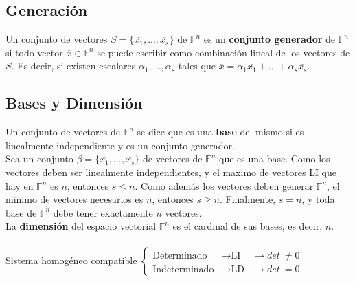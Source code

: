 \documentclass[11pt,a4paper]{article}
\begin{document}
\subsection{Generaci\'on}
Un conjunto de vectores $S = \{ \overline{x_1}, ..., \overline{x_s} \}$ de $\mathbb{F}^n$ es un \textbf{conjunto generador} de $\mathbb{F}^n$ si todo vector $\overline{x} \in \mathbb{F}^n$ se puede escribir como combinaci\'on lineal de los vectores de $S$. Es decir, si existen escalares $\alpha_1, ..., \alpha_s$ tales que $\overline{x} = \alpha_1\overline{x_1} + \hdots + \alpha_s\overline{x_s}$.

\subsection{Bases y Dimensi\'on}
Un conjunto de vectores de $\mathbb{F}^n$ se dice que es una \textbf{base} del mismo si es linealmente independiente y es un conjunto generador.\\

Sea un conjunto $\beta = \{\overline{x_1},...,\overline{x_s}\}$ de vectores de $\mathbb{F}^n$ que es una base. Como los vectores deben ser linealmente independientes, y el maximo de vectores LI que hay en $\mathbb{F}^n$ es $n$, entonces $s \leq n$. Como adem\'as los vectores deben generar $\mathbb{F}^n$, el minimo de vectores necesarios es $n$, entonces $s \geq n$. Finalmente, $s = n$, y toda base de $\mathbb{F}^n$ debe tener exactamente $n$ vectores.\\

La \textbf{dimensi\'on} del espacio vectorial $\mathbb{F}^n$ es el cardinal de sus bases, es decir, $n$.\\ \\

Sistema homog\'eneo compatible 
$\left\{\begin{array} {lll}
\text{Determinado} &\longrightarrow \text{LI} &\longrightarrow det\ \not = 0\\
\text{Indeterminado} &\longrightarrow \text{LD} &\longrightarrow det\ = 0
\end{array}\right.$
\newpage
\end{document}
